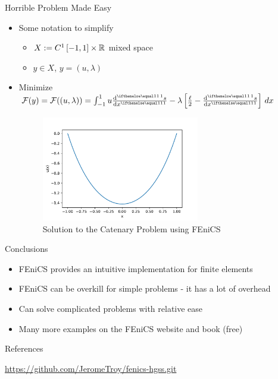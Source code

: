 \documentclass[serif]{beamer}
\begin{document}
\begin{frame}{Horrible Problem Made Easy}
    \begin{itemize}
        \item Some notation to simplify
        \begin{itemize}
            \item $X:= C^1\left[-1, 1\right] \times \mathbb{R}$ mixed space
            \item $y \in X$, $y = (u, \lambda)$
        \end{itemize}
        \item Minimize $\mathcal F(y) = \mathcal F((u, \lambda)) = \int_{-1}^1 u \der{s}{x} - \lambda \left[\frac{\ell}{2} - 
            \der{s}{x}\right] \, dx$
        \begin{figure}
            \centering
            \includegraphics[width=0.65\textwidth,height=0.65\textheight,keepaspectratio]
            {figures/fenics-catenary.pdf}
            \caption{Solution to the Catenary Problem using FEniCS}
            \label{fig:fenics-catenary}
        \end{figure}
    \end{itemize}
\end{frame}

\begin{frame}{Conclusions}
	\begin{itemize}
		\item FEniCS provides an intuitive implementation for finite elements
		\item FEniCS can be overkill for simple problems - it has a lot of overhead
		\item Can solve complicated problems with relative ease
		\item Many more examples on the FEniCS website and book (free)
	\end{itemize}
\end{frame}

\begin{frame}{References}
    \nocite{*}
    
    
    
    \url{https://github.com/JeromeTroy/fenics-hgss.git}
\end{frame}
\end{document}
